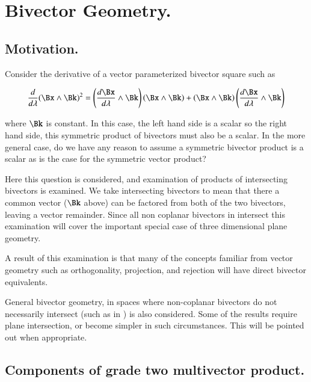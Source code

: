 

\chapter{Bivector Geometry.}
\label{chap:bivector}
{}

\beginArtWithToc

\section{Motivation. }

Consider the derivative of a vector parameterized bivector square such as

\begin{align*}
\frac{d}{d\lambda} {(\Bx \wedge \Bk)^2} = 
\left(\frac{d\Bx}{d\lambda} \wedge \Bk\right) \left(\Bx \wedge \Bk\right)
+\left(\Bx \wedge \Bk\right) \left(\frac{d \Bx}{d\lambda} \wedge \Bk\right)
\end{align*}

where $\Bk$ is constant.  In this case, the left hand side is a scalar so the right hand side, this symmetric product of bivectors must also be a scalar.  In the more general case, do we have any reason to assume a symmetric bivector product is a scalar as is the case for the symmetric vector product?

Here this question is considered, and examination of products of intersecting bivectors is examined.  We take intersecting bivectors to mean that there a common vector ($\Bk$ above) can be factored from both of the two bivectors, leaving a vector remainder.  Since all non coplanar bivectors in  intersect this examination will cover the important special case of three dimensional plane geometry.

A result of this examination is that many of the concepts familiar from vector geometry such as orthogonality, projection, and rejection will have direct bivector equivalents.

General bivector geometry, in spaces where non-coplanar bivectors do not necessarily intersect (such as in ) is also considered.  Some of the results require plane intersection, or become simpler in such circumstances.  This will be pointed out when appropriate.

\section{Components of grade two multivector product.}

